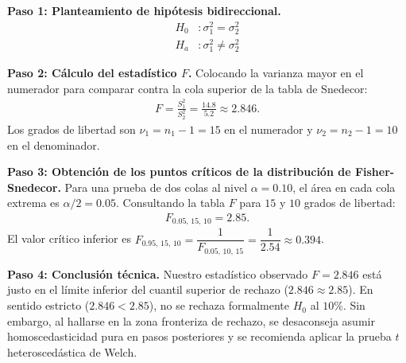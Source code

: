 \begin{solproblema}
	\textbf{Paso 1: Planteamiento de hipótesis bidireccional.}
	\begin{align}
		H_0&: \sigma_1^2 = \sigma_2^2 \\
		H_a&: \sigma_1^2 \neq \sigma_2^2
	\end{align}
	
	\textbf{Paso 2: Cálculo del estadístico $F$.}
	Colocando la varianza mayor en el numerador para comparar contra la cola superior de la tabla de Snedecor:
	\begin{align}
		F = \frac{S_1^2}{S_2^2} = \frac{14.8}{5.2} \approx 2.846.
	\end{align}
	Los grados de libertad son $\nu_1 = n_1 - 1 = 15$ en el numerador y $\nu_2 = n_2 - 1 = 10$ en el denominador.
	
	\textbf{Paso 3: Obtención de los puntos críticos de la distribución de Fisher-Snedecor.}
	Para una prueba de dos colas al nivel $\alpha = 0.10$, el área en cada cola extrema es $\alpha/2 = 0.05$. Consultando la tabla $F$ para $15$ y $10$ grados de libertad:
	\begin{align}
		F_{0.05, \, 15, \, 10} = 2.85.
	\end{align}
	El valor crítico inferior es $F_{0.95, \, 15, \, 10} = \dfrac{1}{F_{0.05, \, 10, \, 15}} = \dfrac{1}{2.54} \approx 0.394$.
	
	\textbf{Paso 4: Conclusión técnica.}
	Nuestro estadístico observado $F = 2.846$ está justo en el límite inferior del cuantil superior de rechazo ($2.846 \approx 2.85$). En sentido estricto ($2.846 < 2.85$), no se rechaza formalmente $H_0$ al $10\%$. Sin embargo, al hallarse en la zona fronteriza de rechazo, se desaconseja asumir homoscedasticidad pura en pasos posteriores y se recomienda aplicar la prueba $t$ heteroscedástica de Welch.
\end{solproblema}


